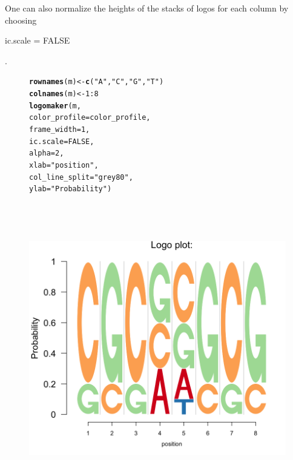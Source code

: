 \documentclass[12pt]{article}\usepackage[]{graphicx}\usepackage[usenames,dvipsnames]{color}
\makeatletter
\newcommand{\hlnum}[1]{\textcolor[rgb]{0.686,0.059,0.569}{#1}}%
\newcommand{\hlstr}[1]{\textcolor[rgb]{0.192,0.494,0.8}{#1}}%
\newcommand{\hlopt}[1]{\textcolor[rgb]{0,0,0}{#1}}%
\newcommand{\hlstd}[1]{\textcolor[rgb]{0.345,0.345,0.345}{#1}}%
\newcommand{\hlkwb}[1]{\textcolor[rgb]{0.69,0.353,0.396}{#1}}%
\newcommand{\hlkwc}[1]{\textcolor[rgb]{0.333,0.667,0.333}{#1}}%
\newcommand{\hlkwd}[1]{\textcolor[rgb]{0.737,0.353,0.396}{\textbf{#1}}}%
\newenvironment{kframe}{%
 \def\at@end@of@kframe{}%
 \ifinner\ifhmode%
  \def\at@end@of@kframe{\end{minipage}}%
  \begin{minipage}{\columnwidth}%
 \fi\fi%
 \def\FrameCommand##1{\hskip\@totalleftmargin \hskip-\fboxsep
 \colorbox{shadecolor}{##1}\hskip-\fboxsep
     \hskip-\linewidth \hskip-\@totalleftmargin \hskip\columnwidth}%
 \MakeFramed {\advance\hsize-\width
   \@totalleftmargin\z@ \linewidth\hsize
   \@setminipage}}%
 {\par\unskip\endMakeFramed%
 \at@end@of@kframe}
\newenvironment{knitrout}{}{} %
\makeatother
\begin{document}
One can also normalize the  heights of the stacks of logos for each column by choosing \begin{verb} ic.scale = FALSE \end{verb}.

\begin{figure}[h]
\begin{center}
\begin{knitrout}
\color{fgcolor}\begin{kframe}
\begin{alltt}
\hlkwd{rownames}\hlstd{(m)} \hlkwb{<-} \hlkwd{c}\hlstd{(}\hlstr{"A"}\hlstd{,} \hlstr{"C"}\hlstd{,} \hlstr{"G"}\hlstd{,} \hlstr{"T"}\hlstd{)}
\hlkwd{colnames}\hlstd{(m)} \hlkwb{<-} \hlnum{1}\hlopt{:}\hlnum{8}
\hlkwd{logomaker}\hlstd{(m,}
          \hlkwc{color_profile} \hlstd{= color_profile,}
          \hlkwc{frame_width} \hlstd{=} \hlnum{1}\hlstd{,}
          \hlkwc{ic.scale} \hlstd{=} \hlnum{FALSE}\hlstd{,}
          \hlkwc{alpha} \hlstd{=} \hlnum{2}\hlstd{,}
          \hlkwc{xlab}\hlstd{=}\hlstr{"position"}\hlstd{,}
          \hlkwc{col_line_split} \hlstd{=} \hlstr{"grey80"}\hlstd{,}
          \hlkwc{ylab} \hlstd{=} \hlstr{"Probability"}\hlstd{)}
\end{alltt}
\end{kframe}
\includegraphics[width=6in,height=5in]{figure/logolas_use_3-1} 

\end{knitrout}
\end{center}
\end{figure}
\end{document}
